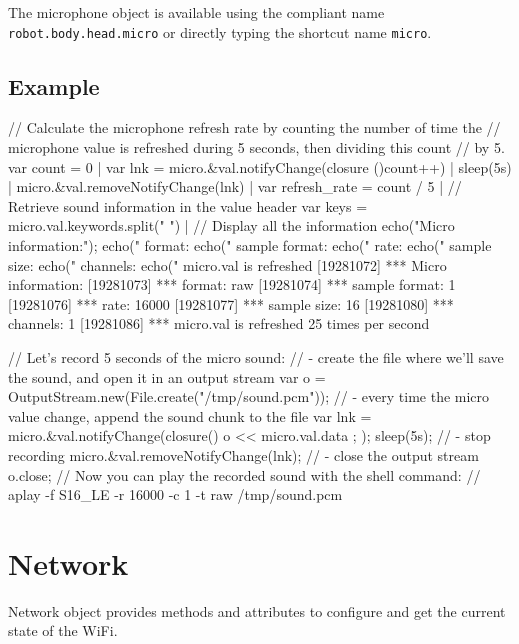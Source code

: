 The microphone object is available using the \gsrapi compliant name
\lstinline{robot.body.head.micro} or directly typing the shortcut name
\lstinline{micro}.

\subsection{Example}

\begin{urbiunchecked}
// Calculate the microphone refresh rate by counting the number of time the
// microphone value is refreshed during 5 seconds, then dividing this count
// by 5.
var count = 0 |
var lnk = micro.&val.notifyChange(closure (){count++}) |
sleep(5s) |
micro.&val.removeNotifyChange(lnk) |
var refresh_rate = count / 5 |
// Retrieve sound information in the value header
var keys = micro.val.keywords.split(" ") |
// Display all the information
echo("Micro information:");
echo(" format: %
echo(" sample format: %
echo(" rate: %
echo(" sample size: %
echo(" channels: %
echo(" micro.val is refreshed %
[19281072] *** Micro information:
[19281073] ***  format: raw
[19281074] ***  sample format: 1
[19281076] ***  rate: 16000
[19281077] ***  sample size: 16
[19281080] ***  channels: 1
[19281086] ***  micro.val is refreshed 25 times per second
\end{urbiunchecked}

\begin{urbiunchecked}
// Let's record 5 seconds of the micro sound:
// - create the file where we'll save the sound, and open it in an output stream
var o = OutputStream.new(File.create("/tmp/sound.pcm"));
// - every time the micro value change, append the sound chunk to the file
var lnk = micro.&val.notifyChange(closure() { o << micro.val.data ; });
sleep(5s);
// - stop recording
micro.&val.removeNotifyChange(lnk);
// - close the output stream
o.close;
// Now you can play the recorded sound with the shell command:
//   aplay -f S16_LE -r 16000 -c 1 -t raw /tmp/sound.pcm
\end{urbiunchecked}

\section{Network}

Network object provides methods and attributes to configure and get
the current state of the WiFi.

